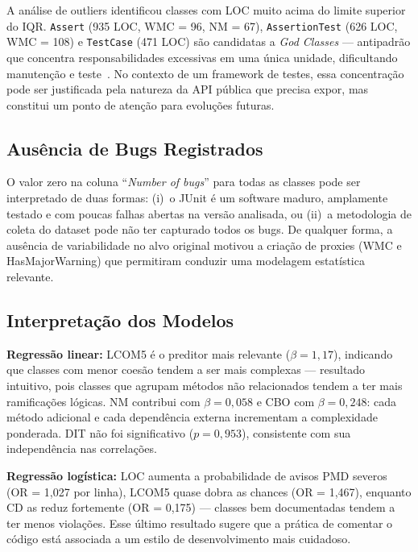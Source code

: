 \documentclass[12pt]{article}
\begin{document}
A análise de outliers identificou classes com LOC muito acima do limite
superior do IQR. \texttt{Assert} (935 LOC, WMC = 96, NM = 67),
\texttt{AssertionTest} (626 LOC, WMC = 108) e \texttt{TestCase} (471 LOC)
são candidatas a \textit{God Classes} — antipadrão que concentra
responsabilidades excessivas em uma única unidade, dificultando
manutenção e teste~\cite{fowler1999}. No contexto de um framework de
testes, essa concentração pode ser justificada pela natureza da API
pública que precisa expor, mas constitui um ponto de atenção para
evoluções futuras.

\subsection{Ausência de Bugs Registrados}

O valor zero na coluna ``\textit{Number of bugs}'' para todas as classes
pode ser interpretado de duas formas: (i)~o JUnit é um software maduro,
amplamente testado e com poucas falhas abertas na versão analisada, ou
(ii)~a metodologia de coleta do dataset pode não ter capturado todos os
bugs. De qualquer forma, a ausência de variabilidade no alvo original
motivou a criação de proxies (WMC e HasMajorWarning) que permitiram
conduzir uma modelagem estatística relevante.

\subsection{Interpretação dos Modelos}

\textbf{Regressão linear:} LCOM5 é o preditor mais relevante
($\beta = 1{,}17$), indicando que classes com menor coesão tendem a
ser mais complexas — resultado intuitivo, pois classes que agrupam
métodos não relacionados tendem a ter mais ramificações lógicas.
NM contribui com $\beta = 0{,}058$ e CBO com $\beta = 0{,}248$:
cada método adicional e cada dependência externa incrementam a
complexidade ponderada. DIT não foi significativo ($p = 0{,}953$),
consistente com sua independência nas correlações.

\textbf{Regressão logística:} LOC aumenta a probabilidade de avisos
PMD severos (OR = 1,027 por linha), LCOM5 quase dobra as chances
(OR = 1,467), enquanto CD as reduz fortemente (OR = 0,175) — classes
bem documentadas tendem a ter menos violações. Esse último resultado
sugere que a prática de comentar o código está associada a um estilo
de desenvolvimento mais cuidadoso.

\end{document}

